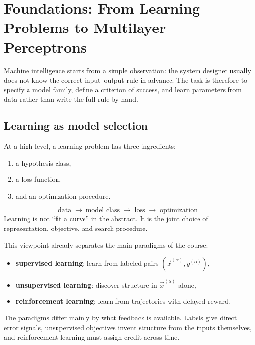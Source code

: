 \chapter{Foundations: From Learning Problems to Multilayer Perceptrons}

Machine intelligence starts from a simple observation: the system designer usually does not know the correct input--output rule in advance. The task is therefore to specify a model family, define a criterion of success, and learn parameters from data rather than write the full rule by hand.

\section{Learning as model selection}

At a high level, a learning problem has three ingredients:
\begin{enumerate}
  \item a hypothesis class,
  \item a loss function,
  \item and an optimization procedure.
\end{enumerate}

\begin{keyequation}
\[
\text{data} \;\longrightarrow\; \text{model class} \;\longrightarrow\; \text{loss} \;\longrightarrow\; \text{optimization}
\]
\tcblower
Learning is not ``fit a curve'' in the abstract. It is the joint choice of representation, objective, and search procedure.
\end{keyequation}

This viewpoint already separates the main paradigms of the course:
\begin{itemize}
  \item \textbf{supervised learning}: learn from labeled pairs $(\vec{x}^{(\alpha)}, y^{(\alpha)})$,
  \item \textbf{unsupervised learning}: discover structure in $\vec{x}^{(\alpha)}$ alone,
  \item \textbf{reinforcement learning}: learn from trajectories with delayed reward.
\end{itemize}

\begin{aside}
The paradigms differ mainly by what feedback is available. Labels give direct error signals, unsupervised objectives invent structure from the inputs themselves, and reinforcement learning must assign credit across time.
\end{aside}


